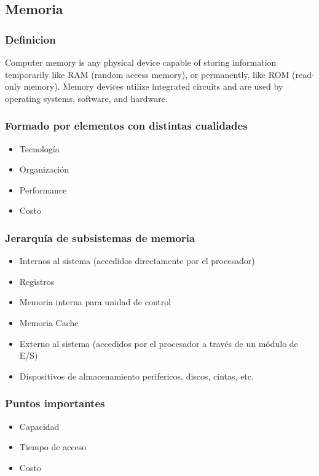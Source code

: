 \subsection{Memoria}

\subsubsection{Definicion}
Computer memory is any physical device capable of storing information temporarily like RAM (random access memory), or permanently, like ROM (read-only memory). Memory devices utilize integrated circuits and are used by operating systems, software, and hardware.


\subsubsection{Formado por elementos con distintas cualidades}
	\begin{itemize}
	\item Tecnología
	\item Organización
	\item Performance
	\item Costo
	\end{itemize}
\subsubsection{Jerarquía de subsistemas de memoria}
	\begin{itemize}
	\item Internos al sistema (accedidos directamente por el procesador)
		\item Registros
		\item Memoria interna para unidad de control
		\item Memoria Cache
	\item Externo al sistema (accedidos por el procesador a través de un módulo de E/S)
		\item Dispositivos de almacenamiento perifericos,  discos, cintas, etc.
	\end{itemize}
\subsubsection{Puntos importantes}
	\begin{itemize}
	\item Capacidad
	\item Tiempo de acceso 
	\item Costo
	\end{itemize}

